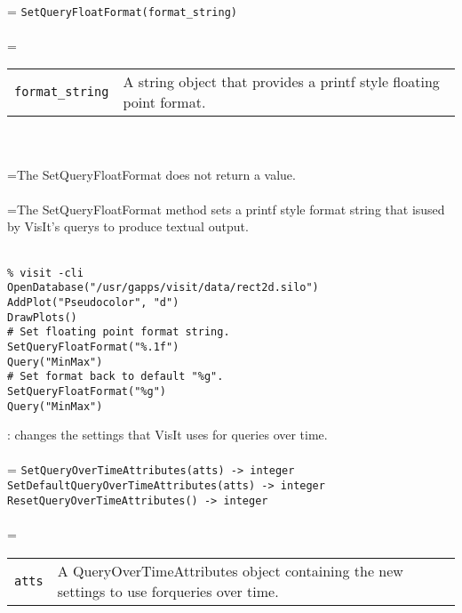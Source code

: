\documentclass[10pt,a4paper]{report}
\begin{document}
 \\ 
\hangindent=\parindent 
\verb!SetQueryFloatFormat(format_string)!\\ [-3mm]

 \\ 
\hangindent=\parindent 
\begin{tabular}{lp{9cm}}
\verb!format_string! & A string object that provides a printf style floating point format. \\
\end{tabular} \\[-2mm]


 \\ 
\hangindent=\parindent The SetQueryFloatFormat does not return a value. \\[-3mm] 

 \\ 
\hangindent=\parindent The SetQueryFloatFormat method sets a printf style format string that isused by VisIt's querys to produce textual output. \\[-3mm] 

\\[-6mm]
\begin{verbatim}% visit -cli
OpenDatabase("/usr/gapps/visit/data/rect2d.silo")
AddPlot("Pseudocolor", "d")
DrawPlots()
# Set floating point format string.
SetQueryFloatFormat("%.1f")
Query("MinMax")
# Set format back to default "%g".
SetQueryFloatFormat("%g")
Query("MinMax")
\end{verbatim}
\newpage


{}
: changes the settings that VisIt uses for queries over time.\\[-3mm]

 \\ 
\hangindent=\parindent 
\verb!SetQueryOverTimeAttributes(atts) -> integer!\\ 
\verb!SetDefaultQueryOverTimeAttributes(atts) -> integer!\\ 
\verb!ResetQueryOverTimeAttributes() -> integer!\\ [-3mm]

 \\ 
\hangindent=\parindent 
\begin{tabular}{lp{9cm}}
\verb!atts! & A QueryOverTimeAttributes object containing the new settings to use forqueries over time. \\
\end{tabular} \\[-2mm]
\end{document}
